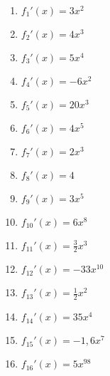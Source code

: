 \begin{Answer}[ref=potenzregelA1]\\
	\begin{minipage}{\textwidth}
		\begin{minipage}{0.5\textwidth}
			\begin{enumerate}[label=\alph*)]
				\item \(f_1'(x)=3x^2\)
				\item \(f_2'(x)=4x^3\)
				\item \(f_3'(x)=5x^4\)
				\item \(f_4'(x)=-6x^2\)
				\item \(f_5'(x)=20x^3\)
				\item \(f_6'(x)=4x^5\)
				\item \(f_7'(x)=2x^3\)
				\item \(f_8'(x)=4\)
			\end{enumerate}
		\end{minipage}%
		\begin{minipage}{0.5\textwidth}
			\begin{enumerate}[label=\alph*)]
				\setcounter{enumi}{8}
				\item \(f_9'(x)=3x^5\)
				\item \(f_{10}'(x)=6x^8\)
				\item \(f_{11}'(x)=\frac{3}{2}x^3\)
				\item \(f_{12}'(x)=-33x^{10}\)
				\item \(f_{13}'(x)=\frac{1}{2}x^2\)
				\item \(f_{14}'(x)=35x^4\)
				\item \(f_{15}'(x)=-1,6x^7\)
				\item \(f_{16}'(x)=5x^{98}\)
			\end{enumerate}
		\end{minipage}%
	\end{minipage}
\end{Answer}